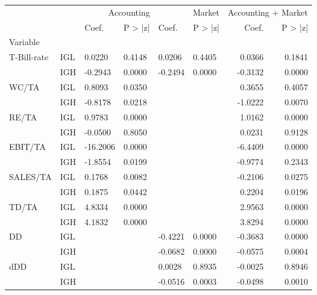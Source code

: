 \begin{tabular}{llllllrr}
\toprule
 &  & \multicolumn{2}{r}{Accounting} & \multicolumn{2}{r}{Market} & \multicolumn{2}{r}{Accounting + Market} \\
 &  & Coef. & P > |z| & Coef. & P > |z| & Coef. & P > |z| \\
Variable &  &  &  &  &  &  &  \\
\midrule
\multirow[t]{2}{*}{T-Bill-rate} & IGL & 0.0220 & 0.4148 & 0.0206 & 0.4405 & 0.0366 & 0.1841 \\
 & IGH & -0.2943 & 0.0000 & -0.2494 & 0.0000 & -0.3132 & 0.0000 \\
\cline{1-8}
\multirow[t]{2}{*}{WC/TA} & IGL & 0.8093 & 0.0350 &  &  & 0.3655 & 0.4057 \\
 & IGH & -0.8178 & 0.0218 &  &  & -1.0222 & 0.0070 \\
\cline{1-8}
\multirow[t]{2}{*}{RE/TA} & IGL & 0.9783 & 0.0000 &  &  & 1.0162 & 0.0000 \\
 & IGH & -0.0500 & 0.8050 &  &  & 0.0231 & 0.9128 \\
\cline{1-8}
\multirow[t]{2}{*}{EBIT/TA} & IGL & -16.2006 & 0.0000 &  &  & -6.4409 & 0.0000 \\
 & IGH & -1.8554 & 0.0199 &  &  & -0.9774 & 0.2343 \\
\cline{1-8}
\multirow[t]{2}{*}{SALES/TA} & IGL & 0.1768 & 0.0082 &  &  & -0.2106 & 0.0275 \\
 & IGH & 0.1875 & 0.0442 &  &  & 0.2204 & 0.0196 \\
\cline{1-8}
\multirow[t]{2}{*}{TD/TA} & IGL & 4.8334 & 0.0000 &  &  & 2.9563 & 0.0000 \\
 & IGH & 4.1832 & 0.0000 &  &  & 3.8294 & 0.0000 \\
\cline{1-8}
\multirow[t]{2}{*}{DD} & IGL &  &  & -0.4221 & 0.0000 & -0.3683 & 0.0000 \\
 & IGH &  &  & -0.0682 & 0.0000 & -0.0575 & 0.0004 \\
\cline{1-8}
\multirow[t]{2}{*}{dDD} & IGL &  &  & 0.0028 & 0.8935 & -0.0025 & 0.8946 \\
 & IGH &  &  & -0.0516 & 0.0003 & -0.0498 & 0.0010 \\
\cline{1-8}
\bottomrule
\end{tabular}
